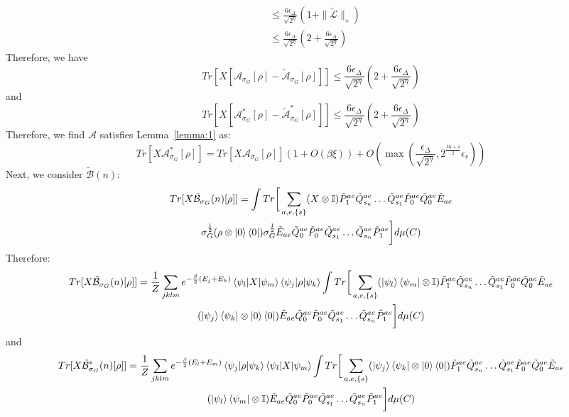 \documentclass[aps,floatfix,10pt,amssymb,amsfont,amsmath,superscriptaddress,float,nofootinbib,longbibliography,nobalancelastpage,twocolumn]{revtex4-2}
\begin{document}
\begin{widetext}
\begin{align}
    &\leq \frac{6\epsilon_{\Delta}}{\sqrt{2^{\eta}}}(1+\|\tilde{\mathcal{L}}\|_{\diamond})\\
    &\leq \frac{6\epsilon_{\Delta}}{\sqrt{2^{\eta}}}(2+\frac{6\epsilon_{\Delta}}{\sqrt{2^{\eta}}})
\end{align}
Therefore, we have 
\begin{equation}
    Tr[X[\mathcal{A}_{\sigma_G}[\rho] - \tilde{\mathcal{A}}_{\sigma_G}[\rho]]] \leq \frac{6\epsilon_{\Delta}}{\sqrt{2^{\eta}}}(2+\frac{6\epsilon_{\Delta}}{\sqrt{2^{\eta}}})
\end{equation}
and
\begin{equation}
    Tr[X[\mathcal{A}^*_{\sigma_G}[\rho] - \tilde{\mathcal{A}}^*_{\sigma_G}[\rho]]] \leq \frac{6\epsilon_{\Delta}}{\sqrt{2^{\eta}}}(2+\frac{6\epsilon_{\Delta}}{\sqrt{2^{\eta}}})
\end{equation}
Therefore, we find $\mathcal{A}$ satisfies Lemma~\ref{lemma:1} as:
\begin{equation}
    Tr\left[X\mathcal{A}^*_{\sigma_G}[\rho]\right] = Tr\left[X\mathcal{A}_{\sigma_G}[\rho]\right](1+O(\beta\xi)) + O(\max(\frac{\epsilon_{\Delta}}{\sqrt{2^{\eta}}},2^{\frac{3 \eta+4}{2}}\epsilon_r))
\end{equation}
Next, we consider $\tilde{\mathcal{B}}(n)$:
\begin{multline}
    Tr[X\tilde{\mathcal{B}}_{\sigma_G}(n)[\rho]] = \int Tr\bigg[ \sum_{a,e,\{s\}}(X\otimes \mathbb{I})\tilde P^{ae}_1\tilde Q^{ae}_{s_n}\ldots \tilde Q^{ae}_{s_1}\tilde P^{ae}_0\tilde Q^{ae}_0\tilde E_{ae} \\\sigma_G^{\frac{1}{2}}(\rho\otimes \ket{0}\bra{0})\sigma_G^{\frac{1}{2}}  \tilde E_{ae}\tilde Q^{ae}_0\tilde P^{ae}_0\tilde Q^{ae}_{s_1}\ldots \tilde Q^{ae}_{s_n}\tilde P^{ae}_1\bigg]d\mu(C)
\end{multline}
Therefore:
\begin{multline}
    Tr[X\tilde{\mathcal{B}}_{\sigma_G}(n)[\rho]] = \frac{1}{Z}\sum_{jklm}e^{-\frac{\beta}{2}(E_j+E_k)}\braket{\psi_l|X|\psi_m}\braket{\psi_j|\rho|\psi_k}\int Tr\bigg[ \sum_{a,e,\{s\}}(\ket{\psi_l}\bra{\psi_m}\otimes \mathbb{I})\tilde P^{ae}_1\tilde Q^{ae}_{s_n}\ldots \tilde Q^{ae}_{s_1}\tilde P^{ae}_0\tilde Q^{ae}_0\tilde E_{ae} \\(\ket{\psi_j}\bra{\psi_k}\otimes \ket{0}\bra{0})  \tilde E_{ae}\tilde Q^{ae}_0\tilde P^{ae}_0\tilde Q^{ae}_{s_1}\ldots \tilde Q^{ae}_{s_n}\tilde P^{ae}_1\bigg]d\mu(C)
\end{multline}
and
\begin{multline}
    Tr[X\tilde{\mathcal{B}}^*_{\sigma_G}(n)[\rho]] = \frac{1}{Z}\sum_{jklm}e^{-\frac{\beta}{2}(E_l+E_m)}\braket{\psi_j|\rho|\psi_k}\braket{\psi_l|X|\psi_m}\int Tr\bigg[ \sum_{a,e,\{s\}}(\ket{\psi_j}\bra{\psi_k}\otimes \ket{0}\bra{0})\tilde P^{ae}_1\tilde Q^{ae}_{s_n}\ldots \tilde Q^{ae}_{s_1}\tilde P^{ae}_0\tilde Q^{ae}_0\tilde E_{ae} \\(\ket{\psi_l}\bra{\psi_m}\otimes \mathbb{I})  \tilde E_{ae}\tilde Q^{ae}_0\tilde P^{ae}_0\tilde Q^{ae}_{s_1}\ldots \tilde Q^{ae}_{s_n}\tilde P^{ae}_1\bigg]d\mu(C)

\end{multline}
\end{widetext}
\end{document}
